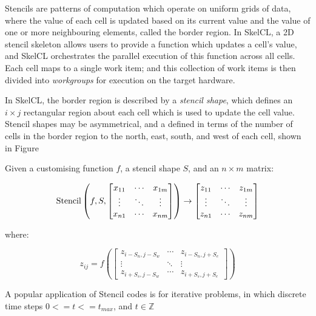 
Stencils are patterns of computation which operate on uniform grids of
data, where the value of each cell is updated based on its current
value and the value of one or more neighbouring elements, called the
border region. In SkelCL, a 2D stencil skeleton allows users to
provide a function which updates a cell's value, and SkelCL
orchestrates the parallel execution of this function across all
cells. Each cell maps to a single work item; and this collection of
work items is then divided into \emph{workgroups} for execution on the
target hardware.

In SkelCL, the border region is described by a \emph{stencil shape},
which defines an $i \times j$ rectangular region about each cell which
is used to update the cell value. Stencil shapes may be asymmetrical,
and a defined in terms of the number of cells in the border region to
the north, east, south, and west of each cell, shown in
Figure~

Given a customising function $f$, a stencil shape $S$, and an
$n \times m$ matrix:

\begin{equation}
\operatorname*{Stencil} \left( f, S,
\begin{bmatrix}
  x_{11} & \cdots & x_{1m} \\
  \vdots & \ddots & \vdots \\
  x_{n1} & \cdots & x_{nm}
\end{bmatrix} \right)
\to
\begin{bmatrix}
  z_{11} & \cdots & z_{1m} \\
  \vdots & \ddots & \vdots \\
  z_{n1} & \cdots & z_{nm}
\end{bmatrix}
\end{equation}

where:

\begin{equation}
z_{ij} = f \left(
\begin{bmatrix}
  z_{i-S_n,j-S_w} & \cdots & z_{i-S_n,j+S_e} \\
  \vdots & \ddots & \vdots \\
  z_{i+S_s,j-S_w} & \cdots & z_{i+S_s,j+S_e}
\end{bmatrix} \right)
\end{equation}

A popular application of Stencil codes is for iterative problems, in
which \todo{\ldots} discrete time steps $0 <= t <= t_{max}$, and
$t \in \mathbb{Z}$

